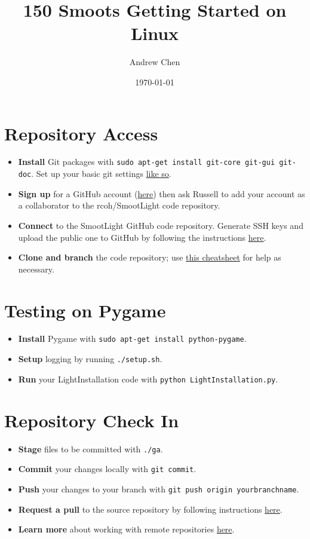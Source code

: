 \documentclass{article}
\begin{document}
    \title{150 Smoots Getting Started on Linux}
    \author{Andrew Chen}
    \date{\today}
    \maketitle
	\section{Repository Access}
		\begin{itemize} 
			\item \textbf{Install} Git packages with \texttt{sudo apt-get install git-core git-gui git-doc}. Set up your basic git settings \href{http://help.github.com/git-email-settings/}{like so}.
			\item \textbf{Sign up} for a GitHub account (\href{https://github.com/signup/free}{here}) then ask Russell to add your account as a collaborator to the rcoh/SmootLight code repository.
			\item \textbf{Connect} to the SmootLight GitHub code repository. Generate SSH keys and upload the public one to GitHub by following the instructions \href{http://help.github.com/linux-key-setup/}{here}.
			\item \textbf{Clone and branch} the code repository; use \href{http://help.github.com/git-cheat-sheets/}{this cheatsheet} for help as necessary.
		\end{itemize}
	\section{Testing on Pygame}
		\begin{itemize} 
			\item \textbf{Install} Pygame with \texttt{sudo apt-get install python-pygame}.
			\item \textbf{Setup} logging by running \texttt{./setup.sh}.
			\item \textbf{Run} your LightInstallation code with \texttt{python LightInstallation.py}.
		\end{itemize}
	\section{Repository Check In}
		\begin{itemize}
			\item \textbf{Stage} files to be committed with \texttt{./ga}.
			\item \textbf{Commit} your changes locally with \texttt{git commit}.
			\item \textbf{Push} your changes to your branch with \texttt{git push origin yourbranchname}.
			\item \textbf{Request a pull} to the source repository by following instructions \href{http://help.github.com/pull-requests/}{here}.
			\item \textbf{Learn more} about working with remote repositories \href{http://help.github.com/remotes/}{here}.
		\end{itemize}
\end{document}
